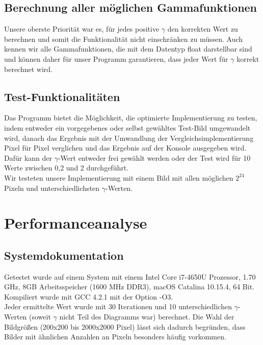 \documentclass[course=erap]{aspdoc}
\begin{document}
	\subsection{Berechnung aller möglichen Gammafunktionen}
	Unsere oberste Priorität war es, für jedes positive $\gamma$ den korrekten Wert zu berechnen und somit die Funktionalität nicht  einschränken zu müssen. Auch kennen wir alle Gammafunktionen, die mit dem Datentyp float darstellbar sind und können daher für unser Programm garantieren, dass jeder Wert für $\gamma$ korrekt berechnet wird. 
	
	\subsection{Test-Funktionalitäten}
	Das Programm bietet die Möglichkeit, die optimierte Implementierung zu testen, indem entweder ein vorgegebenes oder selbst gewähltes Test-Bild umgewandelt wird, danach das Ergebnis mit der Umwandlung der Vergleichsimplementierung Pixel für Pixel verglichen und das Ergebnis auf der Konsole ausgegeben wird. Dafür kann der $\gamma$-Wert entweder frei gewählt werden oder der Test wird für 10 Werte zwischen 0,2 und 2 durchgeführt.\\
	Wir testeten unsere Implementierung mit einem Bild mit allen möglichen $2^{24}$ Pixeln und unterschiedlichsten $\gamma$-Werten.
	
	\section{Performanceanalyse}
	\subsection{Systemdokumentation}
	Getestet wurde auf einem System mit einem Intel Core i7-4650U Prozessor, 1.70 GHz, 8GB Arbeitsspeicher (1600 MHz DDR3), macOS Catalina 10.15.4, 64 Bit.
    Kompiliert wurde mit GCC 4.2.1 mit der Option -O3.\\
    Jeder ermittelte Wert wurde mit 30 Iterationen und 10 unterschiedlichen $\gamma$-Werten (soweit $\gamma$ nicht Teil des Diagramms war) berechnet. Die Wahl der Bildgrößen (200x200 bis 2000x2000 Pixel) lässt sich dadurch begründen, dass Bilder mit ähnlichen Anzahlen an Pixeln besonders häufig vorkommen.
\end{document}
